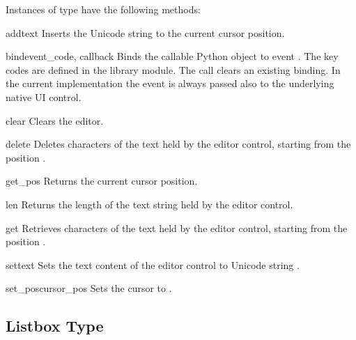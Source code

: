 Instances of  type have the following methods:

\begin{methoddesc}[Text]{add}{text}
Inserts the Unicode string  to the current cursor position.
\end{methoddesc}

\begin{methoddesc}[Text]{bind}{event_code, callback}
Binds the callable Python object  to event
. The key codes are defined in 
the  library module. The call 
 clears an 
existing binding. In the current implementation the event is always
passed also to the underlying native UI control.
\end{methoddesc}

\begin{methoddesc}[Text]{clear}{}
Clears the editor.
\end{methoddesc}

\begin{methoddesc}[Text]{delete}{}
Deletes  characters of the text held by the editor control, 
starting from the position .
\end{methoddesc}

\begin{methoddesc}[Text]{get_pos}{}
Returns the current cursor position.
\end{methoddesc}

\begin{methoddesc}[Text]{len}{}
Returns the length of the text string held by the editor control.
\end{methoddesc}

\begin{methoddesc}[Text]{get}{}
Retrieves  characters of the text held by the editor control, 
starting from the position .
\end{methoddesc}

\begin{methoddesc}[Text]{set}{text}
Sets the text content of the editor control to Unicode string 
.
\end{methoddesc}

\begin{methoddesc}[Text]{set_pos}{cursor_pos}
Sets the cursor to .
\end{methoddesc}

\subsection{Listbox Type}
\label{subsec:listbox}

